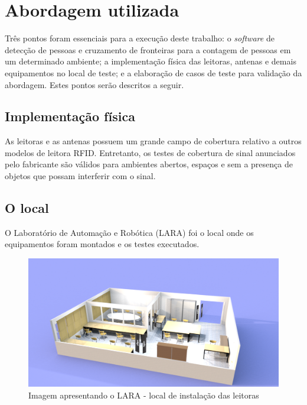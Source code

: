  
 \section{Abordagem utilizada}
 
 Três pontos foram essenciais para a execução deste trabalho: o \textit{software} de detecção de pessoas e cruzamento de fronteiras para a contagem de pessoas em um determinado ambiente; a implementação física das leitoras, antenas e demais equipamentos no local de teste; e a elaboração de casos de teste para  validação da abordagem. Estes pontos serão descritos a seguir.
 
  
 \subsection{Implementação física}
 
 As leitoras e as antenas possuem um grande campo de cobertura relativo a outros modelos de leitora RFID. Entretanto, os testes de cobertura de sinal anunciados pelo fabricante são válidos para ambientes abertos, espaços e sem a presença de objetos que possam interferir com o sinal.
 
 \subsection{O local}
 
 O Laboratório de Automação e Robótica (LARA) foi o local onde os equipamentos foram montados e os testes executados.

  \begin{figure}[H]
    \centering
    \includegraphics[width=1\linewidth]{figs/Metodologia/LARA_leitoras-1.png}
    \caption{Imagem apresentando o LARA - local de instalação das leitoras}
    \label{fig:LARA1}
\end{figure}

